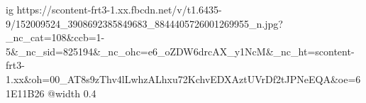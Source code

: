  
 
 
 
 

\ifcmt
  ig https://scontent-frt3-1.xx.fbcdn.net/v/t1.6435-9/152009524_3908692385849683_8844405726001269955_n.jpg?_nc_cat=108&ccb=1-5&_nc_sid=825194&_nc_ohc=e6_oZDW6drcAX_y1NcM&_nc_ht=scontent-frt3-1.xx&oh=00_AT8s9zThv4lLwhzALhxu72KchvEDXAztUVrDf2tJPNeEQA&oe=61E11B26
  @width 0.4
\fi
